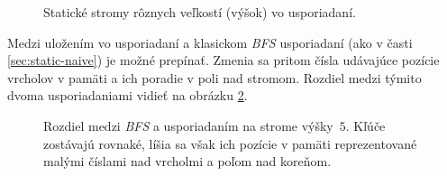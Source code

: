 \begin{figure}
    \hspace{0.5cm}
    \caption[Statické stromy rôznych veľkostí]{Statické stromy rôznych veľkostí (výšok) vo  usporiadaní.}
    \label{fig:ss_static_sizes}
\end{figure}

Medzi uložením vo  usporiadaní a klasickom \emph{BFS} usporiadaní (ako v časti \ref{sec:static-naive}) je možné prepínať. Zmenia sa pritom čísla udávajúce pozície vrcholov v pamäti a ich poradie v poli nad stromom. Rozdiel medzi týmito dvoma usporiadaniami vidieť na obrázku \ref{fig:ss_static_order}.

\begin{figure}
    \centering
    \caption[Rozdiel medzi \emph{BFS} a  usporiadaním]{Rozdiel medzi \emph{BFS} a  usporiadaním na strome výšky~$5$. Kľúče zostávajú rovnaké, líšia sa však ich pozície v pamäti reprezentované malými číslami nad vrcholmi a poľom nad koreňom.}
    \label{fig:ss_static_order}
\end{figure}

